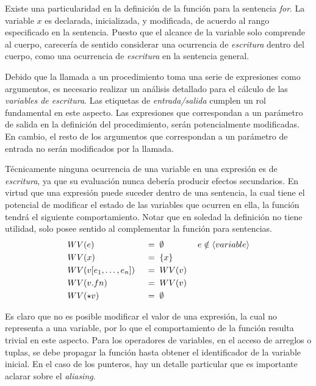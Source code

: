 Existe una particularidad en la definición de la función para la sentencia \textit{for}.
La variable $x$ es declarada, inicializada, y modificada, de acuerdo al rango especificado en la sentencia.
Puesto que el alcance de la variable solo comprende al cuerpo, carecería de sentido considerar una ocurrencia de \textit{escritura} dentro del cuerpo, como una ocurrencia de \textit{escritura} en la sentencia general.

Debido que la llamada a un procedimiento toma una serie de expresiones como argumentos, es necesario realizar un análisis detallado para el cálculo de las \textit{variables de escritura}.
Las etiquetas de \textit{entrada/salida} cumplen un rol fundamental en este aspecto.
Las expresiones que correspondan a un parámetro de salida en la definición del procedimiento, serán potencialmente modificadas.
En cambio, el resto de los argumentos que correspondan a un parámetro de entrada no serán modificados por la llamada.

Técnicamente ninguna ocurrencia de una variable en una expresión es de \textit{escritura}, ya que su evaluación nunca debería producir efectos secundarios.
En virtud que una expresión puede suceder dentro de una sentencia, la cual tiene el potencial de modificar el estado de las variables que ocurren en ella, la función tendrá el siguiente comportamiento.
Notar que en soledad la definición no tiene utilidad, solo posee sentido al complementar la función para sentencias.
\begin{alignat*}{3}
&WV(e)
&&\;=\;
\emptyset
&&\;e \notin \langle variable \rangle
\\
&WV(x)
&&\;=\;
\{ x \}
\\
&WV(v [e_1, \ldots, e_n])
&&\;=\;
WV(v)
\\
&WV(v.fn)
&&\;=\;
WV(v)
\\
&WV(\star v)
&&\;=\;
\emptyset
\end{alignat*}

Es claro que no es posible modificar el valor de una expresión, la cual no representa a una variable, por lo que el comportamiento de la función resulta trivial en este aspecto.
Para los operadores de variables, en el acceso de arreglos o tuplas, se debe propagar la función hasta obtener el identificador de la variable inicial.
En el caso de los punteros, hay un detalle particular que es importante aclarar sobre el \textit{aliasing}.

